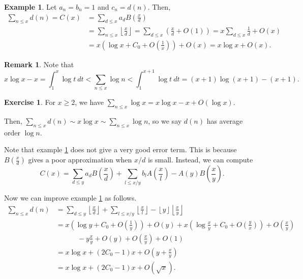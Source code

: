 \documentclass[11pt]{article}
\theoremstyle{definition}
\newtheorem{example}[thm]{Example}
\newtheorem{exe}[thm]{Exercise}
\newtheorem{remark}[thm]{Remark}
\newcommand{\floor}[1]{\left\lfloor #1 \right\rfloor}
\begin{document}
\begin{example}
\label{ex.hyperbola}
Let $a_n=b_n=1$ and $c_n=d(n)$. Then,
\begin{align*}
\sum_{n\le x} d(n) = C(x) &= \sum_{d\le x} a_d B\left(\frac{x}{d}\right) \\
&= \sum_{n\le x} \floor{\frac{x}{d}}
= \sum_{d\le x}\left(\frac{x}{d} + O(1)\right)
= x \sum_{d\le x} \frac1d + O(x) \\
&= x\left(\log x + C_0 + O\left(\frac1x\right)\right) + O(x)
= x\log x + O(x) .
\end{align*}
\end{example}

\begin{remark}
Note that
\[
x\log x - x = \int_1^x\log t ~dt
< \sum_{n\le x} \log n
< \int_1^{x+1}\log t ~dt
= (x+1)\log(x+1) - (x+1) .
\]
\end{remark}

\begin{exe}
For $x\ge2$, we have $\sum_{n\le x}\log x = x\log x-x+O(\log x)$.
\end{exe}

Then, $\sum_{n\le x}d(n) \sim x\log x \sim \sum_{n\le x}\log n$, so we say $d(n)$ has
average order $\log n$.

Note that example \ref{ex.hyperbola} does not give a very good error term. This is because
$B\left(\frac{x}{d}\right)$ gives a poor approximation when $x/d$ is small. Instead, we can
compute
\begin{equation}[Dirichlet's Hyperbola Method]
C(x) = \sum_{d\le y} a_d B\left(\frac{x}{d}\right)
+ \sum_{l\le x/y} b_l A\left(\frac{x}{l}\right)
- A(y)B\left(\frac{x}{y}\right) .
\end{equation}

Now we can improve example \ref{ex.hyperbola} as follows.
\begin{align*}
\sum_{n\le x} d(n) &= \sum_{d\le y} \floor{\frac{x}{d}}
+ \sum_{l\le x/y} \floor{\frac{x}{l}}
- \floor{y}\floor{\frac{x}{y}} \\
&= x\left(\log y+C_0+O\left(\frac1y\right)\right) + O(y)
+ x\left(\log\frac{x}{y} + C_0 + O\left(\frac{y}{x}\right)\right)
+ O\left(\frac{x}{y}\right) \\
&\hspace{36pt}- y\frac{x}{y} + O(y) + O\left(\frac{x}{y}\right) + O(1) \\
&= x\log x + (2C_0-1)x + O\left(y+\frac{x}{y}\right) \\
&= x\log x + (2C_0-1)x + O\left(\sqrt x\right) .
\end{align*}
\end{document}

